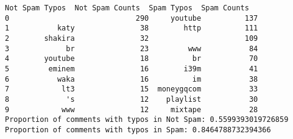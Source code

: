 \documentclass[11pt]{article}
\begin{document}
    \begin{Verbatim}[commandchars=\\\{\}]
  Not Spam Typos  Not Spam Counts  Spam Typos  Spam Counts
0                             290     youtube          137
1           katy               38        http          111
2        shakira               32                      109
3             br               23         www           84
4        youtube               18          br           70
5         eminem               16        i39m           41
6           waka               16          im           38
7            lt3               15  moneygqcom           33
8             's               12    playlist           30
9            www               12     mixtape           28
Proportion of comments with typos in Not Spam: 0.5599393019726859
Proportion of comments with typos in Spam: 0.8464788732394366
    \end{Verbatim}
\end{document}
